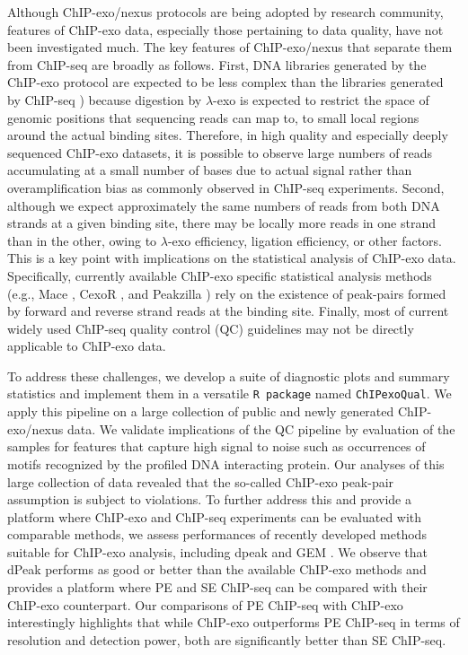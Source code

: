 \documentclass{bmcart}
\newcommand{\pname}[1]{\texttt{ChIPexoQual}}
\begin{document}
Although ChIP-exo/nexus protocols are being adopted by  research community, features of 
ChIP-exo data, especially those pertaining to data quality,  have not been investigated much. The key features of ChIP-exo/nexus that separate them from ChIP-seq are broadly as follows. First, 
DNA libraries
generated by the ChIP-exo protocol are expected to be less complex than the
libraries generated by ChIP-seq \cite{exo_review})  because digestion by $\lambda$-exo   is expected to restrict the space of genomic positions that sequencing reads can map to, to small local regions around the actual binding sites. Therefore, in  high quality and especially deeply sequenced ChIP-exo datasets, it is possible to observe large numbers of reads accumulating at a small number of bases due to actual signal rather than overamplification bias as commonly observed in ChIP-seq experiments.
Second, although we expect approximately the same
numbers  of reads from  both DNA strands at a given binding site,  there may be locally more reads in
one strand than in the other, owing to $\lambda$-exo efficiency, ligation efficiency, or other factors. 
This is a key point with implications on the statistical analysis of ChIP-exo data. Specifically, 
currently available ChIP-exo specific statistical analysis methods   (e.g., 
 Mace \cite{mace}, CexoR \cite{cexor}, and   Peakzilla \cite{peakzilla}) rely on the existence of 
peak-pairs formed by forward and reverse strand reads at the binding site. 
Finally, most of current widely used ChIP-seq
quality control (QC) guidelines  \cite{encode_qc}
may not be directly applicable to ChIP-exo data.

To address these challenges, we develop 
a suite of diagnostic plots and summary statistics and implement them in a versatile \texttt{R package} named \pname{}.
We apply this pipeline on  a large collection of public and newly generated ChIP-exo/nexus data. We validate implications of the QC pipeline  by  evaluation of the samples for features that capture high signal to noise such as occurrences of   motifs recognized by the profiled DNA interacting protein. Our analyses of this large collection of data revealed that  the so-called ChIP-exo peak-pair assumption is subject to violations. To further address this and provide a platform where ChIP-exo and  ChIP-seq experiments can be evaluated with comparable methods, we assess performances of recently developed methods suitable for ChIP-exo analysis, including dpeak \cite{dpeak} and GEM \cite{gem}. We observe that dPeak performs as good or better than the available ChIP-exo methods and provides a platform where PE and SE ChIP-seq can be compared with their ChIP-exo counterpart. Our comparisons of PE ChIP-seq with ChIP-exo interestingly highlights that while ChIP-exo outperforms PE ChIP-seq in terms of resolution and detection power, both are significantly better than SE ChIP-seq.
\end{document}

